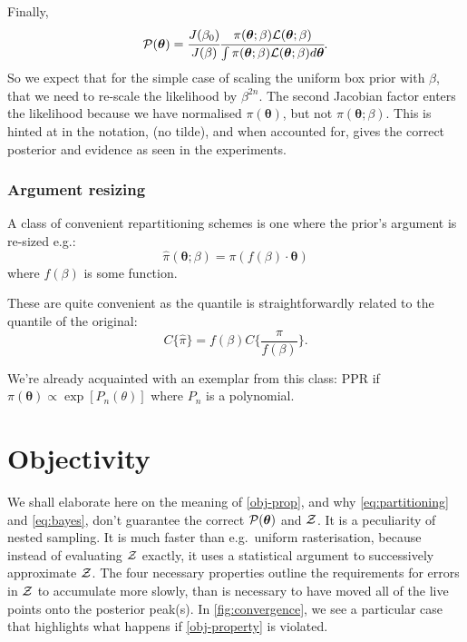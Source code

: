 \documentclass[usenatbib]{mnras}
\begin{document}
Finally, 
\begin{equation}
 {\cal P}(\bm{\theta}) = \cfrac{J(\beta_{0})}{J(\beta)} \cfrac{\pi(\bm{\theta}; \beta) {\cal L}(\bm{\theta}; \beta)}{\int \pi(\bm{\theta}; \beta) {\cal L}(\bm{\theta}; \beta) d \bm{\theta}}.
\end{equation}
So we expect that for the simple case of scaling the uniform box
prior with \(\beta\), that we need to re-scale the likelihood by
\(\beta^{2n}\). The second Jacobian factor enters the likelihood because
we have normalised \(\pi(\bm{\theta})\), but not \(\pi(\bm{\theta}; \beta)\). This is hinted at in
the notation, (no tilde), and when accounted for, gives  the correct
posterior and evidence as seen in the experiments.

\subsubsection{Argument resizing}\label{sec:orgfe92f25}

A class of convenient repartitioning schemes is one where the prior's
argument is re-sized e.g.:
\begin{equation}
  \label{eq:argument-resize}
  \hat{\pi} (\bm{\theta}; \beta) = \pi (f(\beta)\cdot\bm{\theta})
\end{equation}
where \(f(\beta)\) is some function.

These are quite convenient as the quantile is straightforwardly
related to the quantile of the original:
\begin{equation}
  \label{eq:quantile-stuff}
  C\{\hat{\pi}\} = f(\beta) C\{\frac{\pi}{f(\beta)}\}.
\end{equation}

We're already acquainted with an exemplar from this class: PPR if
\( \pi (\bm{\theta}) \propto \exp [P_{n}(\theta)]\) where $P_{n}$ is a
polynomial.


\section{Objectivity\label{sec:objectivity}}
We shall elaborate here on the meaning of \cref{obj-prop}, and why
\cref{eq:partitioning} and \cref{eq:bayes}, don't guarantee the
correct \( {\cal P}(\bm{\theta})\) and ${\cal Z}$.  It is a
peculiarity of nested sampling. It is much faster than e.g.~uniform
rasterisation, because instead of evaluating ${\cal Z}$ exactly, it
uses a statistical argument to successively approximate ${\cal
  Z}$. The four necessary properties outline the requirements for
errors in ${\cal Z}$ to accumulate more slowly, than is necessary to
have moved all of the live points onto the posterior peak(s). In
\cref{fig:convergence}, we see a particular case that highlights what
happens if \cref{obj-property} is violated.
\end{document}
